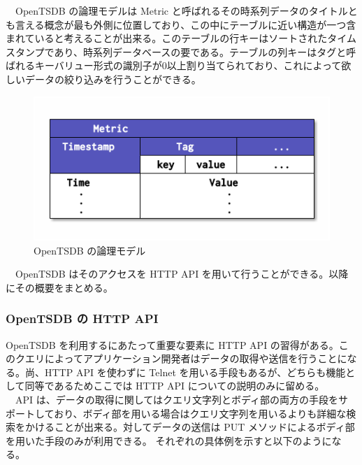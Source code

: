 \documentclass{scrartcl}
\begin{document}
\newpage

　OpenTSDB の論理モデルは Metric と呼ばれるその時系列データのタイトルとも言える概念が最も外側に位置しており、この中にテーブルに近い構造が一つ含まれていると考えることが出来る。このテーブルの行キーはソートされたタイムスタンプであり、時系列データベースの要である。テーブルの列キーはタグと呼ばれるキーバリュー形式の識別子が0以上割り当てられており、これによって欲しいデータの絞り込みを行うことができる。\\

\begin{figure}[htbp]
\centering
\includegraphics[width=12cm]{hoge4.png}
\caption{OpenTSDB の論理モデル}
\end{figure}

　OpenTSDB はそのアクセスを HTTP API を用いて行うことができる。以降にその概要をまとめる。\\

\subsubsection{OpenTSDB の HTTP API}
\label{sec:org67ce613}
OpenTSDB を利用するにあたって重要な要素に HTTP API の習得がある。このクエリによってアプリケーション開発者はデータの取得や送信を行うことになる。尚、HTTP API を使わずに Telnet を用いる手段もあるが、どちらも機能として同等であるためここでは HTTP API についての説明のみに留める。\\
　API は、データの取得に関してはクエリ文字列とボディ部の両方の手段をサポートしており、ボディ部を用いる場合はクエリ文字列を用いるよりも詳細な検索をかけることが出来る。対してデータの送信は PUT メソッドによるボディ部を用いた手段のみが利用できる。 それぞれの具体例を示すと以下のようになる。\\
\end{document}
